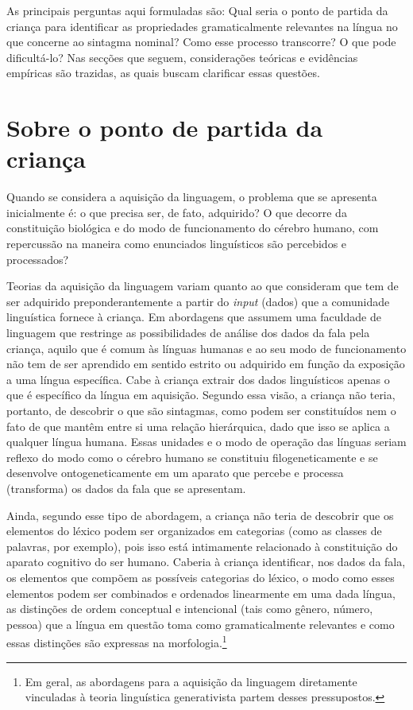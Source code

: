 \documentclass[output=paper]{LSP/langsci}
\begin{document}
As principais perguntas aqui formuladas são: Qual seria o ponto de partida da criança para identificar as propriedades gramaticalmente relevantes na língua no que concerne ao sintagma nominal? Como esse processo transcorre? O que pode dificultá-lo?  Nas secções que seguem, considerações teóricas e evidências empíricas são trazidas, as quais buscam clarificar essas questões.

\section{Sobre o ponto de partida da criança}
\label{sec:correanp_sobre}

Quando se considera a aquisição da linguagem, o problema que se apresenta inicialmente é: o que precisa ser, de fato, adquirido? O que decorre da constituição biológica e do modo de funcionamento do cérebro humano, com repercussão na maneira como enunciados linguísticos são percebidos e processados? 

Teorias da aquisição da linguagem variam quanto ao que consideram que tem de ser adquirido preponderantemente a partir do \textit{input} (dados) que a comunidade linguística fornece à criança. Em abordagens que assumem uma faculdade de linguagem que restringe as possibilidades de análise dos dados da fala pela criança, aquilo que é comum às línguas humanas e ao seu modo de funcionamento não tem de ser aprendido em sentido estrito ou adquirido em função da exposição a uma língua específica. Cabe à criança extrair dos dados linguísticos apenas o que é específico da língua em aquisição. Segundo essa visão, a criança não teria, portanto, de descobrir o que são sintagmas, como podem ser constituídos nem o fato de que mantêm entre si uma relação hierárquica, dado que isso se aplica a qualquer língua humana. Essas unidades e o modo de operação das línguas seriam reflexo do modo como o cérebro humano se constituiu filogeneticamente e se desenvolve ontogeneticamente em um aparato que percebe e processa (transforma) os dados da fala que se apresentam. 

Ainda, segundo esse tipo de abordagem, a criança não teria de descobrir que os elementos do léxico podem ser organizados em categorias (como as classes de palavras, por exemplo), pois isso está intimamente relacionado à constituição do aparato cognitivo do ser humano. Caberia à criança identificar, nos dados da fala, os elementos que compõem as possíveis categorias do léxico, o modo como esses elementos podem ser combinados e ordenados linearmente em uma dada língua, as distinções de ordem conceptual e intencional (tais como gênero, número, pessoa) que a língua em questão toma como gramaticalmente relevantes e como essas distinções são expressas na morfologia.\footnote{Em geral, as abordagens para a aquisição da linguagem diretamente vinculadas à teoria linguística generativista partem desses pressupostos.}
\end{document}
